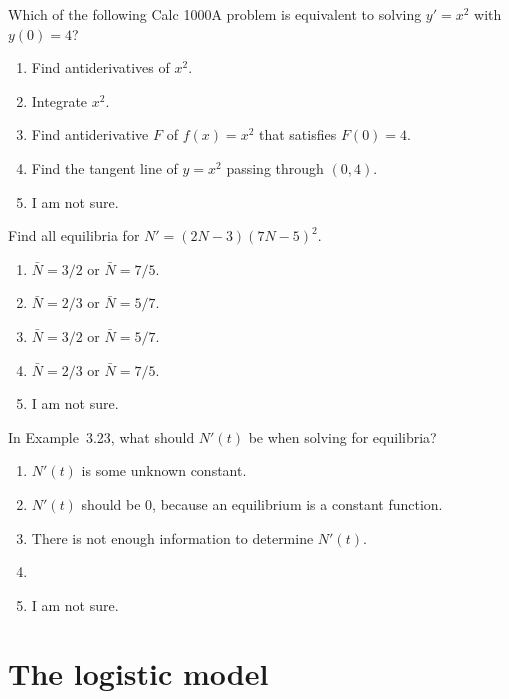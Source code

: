 \documentclass[aspectratio=169, t, 14pt]{beamer}
\begin{document}
\begin{frame}
  Which of the following Calc 1000A problem is equivalent to solving \(y' = x^{2}\) with \(y(0) = 4\)?
  \begin{enumerate} 
    \item Find antiderivatives of \(x^{2}\).
    \item Integrate \(x^{2}\).
    \item Find antiderivative \(F\) of \(f(x) = x^{2}\) that satisfies \(F(0) = 4\).
    \item Find the tangent line of \(y = x^{2}\) passing through \((0,4)\).
    \item I am not sure. 
  \end{enumerate}
\end{frame}

\begin{poll}
  Find all equilibria for \(N' = (2N - 3)(7N-5)^{2}\).

  \begin{enumerate}
    \item \(\bar{N} = 3/2\) or \(\bar{N} = 7/5\).
    \item \(\bar{N} = 2/3\) or \(\bar{N} = 5/7\).
    \item \(\bar{N} = 3/2\) or \(\bar{N} = 5/7\).
    \item \(\bar{N} = 2/3\) or \(\bar{N} = 7/5\).
    \item I am not sure.
  \end{enumerate}
\end{poll}

\begin{frame}
  In Example~3.23, what should \(N'(t)\) be when solving for equilibria?

  \begin{enumerate} 
    \item \(N'(t)\) is some unknown constant.
    \item \(N'(t)\) should be \(0\), because an equilibrium is a constant function.
    \item There is not enough information to determine \(N'(t)\).
    \item 
    \item I am not sure. 
  \end{enumerate}
\end{frame}

\section{The logistic model}
\end{document}
